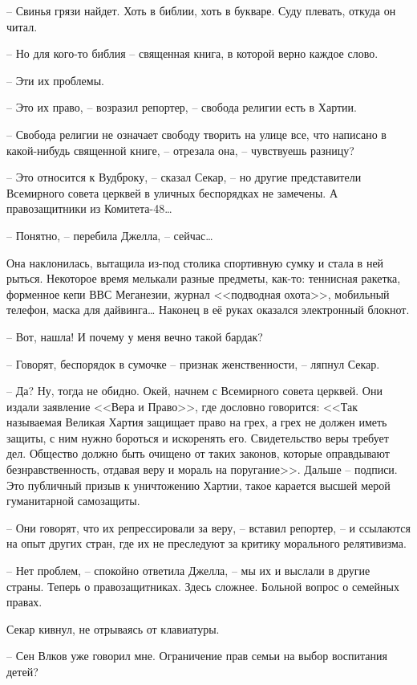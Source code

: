 -- Свинья грязи найдет. Хоть в библии, хоть в букваре. Суду плевать, откуда он читал.

-- Но для кого-то библия -- священная книга, в которой верно каждое слово.

-- Эти их проблемы.

-- Это их право, -- возразил репортер, -- свобода религии есть в Хартии.

-- Свобода религии не означает свободу творить на улице все, что написано в какой-нибудь священной книге, -- отрезала она, -- чувствуешь разницу?

-- Это относится к Вудброку, -- сказал Секар, -- но другие представители Всемирного совета церквей в уличных беспорядках не замечены. А правозащитники из Комитета-48\ldots{}

-- Понятно, -- перебила Джелла, -- сейчас\ldots{}

Она наклонилась, вытащила из-под столика спортивную сумку и стала в ней рыться. Некоторое время мелькали разные предметы, как-то: теннисная ракетка, форменное кепи ВВС Меганезии, журнал <<подводная охота>>, мобильный телефон, маска для дайвинга\ldots{} Наконец в её руках оказался электронный блокнот.

-- Вот, нашла! И почему у меня вечно такой бардак?

-- Говорят, беспорядок в сумочке -- признак женственности, -- ляпнул Секар.

-- Да? Ну, тогда не обидно. Окей, начнем с Всемирного совета церквей. Они издали заявление <<Вера и Право>>, где дословно говорится: <<Так называемая Великая Хартия защищает право на грех, а грех не должен иметь защиты, с ним нужно бороться и искоренять его. Свидетельство веры требует дел. Общество должно быть очищено от таких законов, которые оправдывают безнравственность, отдавая веру и мораль на поругание>>. Дальше -- подписи. Это публичный призыв к уничтожению Хартии, такое карается высшей мерой гуманитарной самозащиты.

-- Они говорят, что их репрессировали за веру, -- вставил репортер, -- и ссылаются на опыт других стран, где их не преследуют за критику морального релятивизма.

-- Нет проблем, -- спокойно ответила Джелла, -- мы их и выслали в другие страны. Теперь о правозащитниках. Здесь сложнее. Больной вопрос о семейных правах.

Секар кивнул, не отрываясь от клавиатуры.

-- Сен Влков уже говорил мне. Ограничение прав семьи на выбор воспитания детей?

